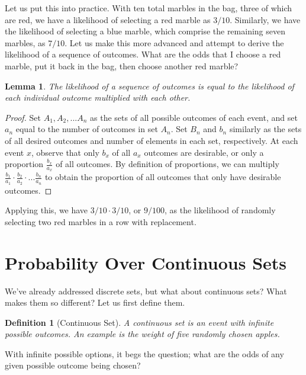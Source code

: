 \documentclass{article}
\newtheorem{definition}{Definition}[section]
\newtheorem{lemma}[theorem]{Lemma}
\begin{document}
Let us put this into practice. With ten total marbles in the bag, three of which are red, we have a likelihood of selecting a red marble as $3/10$. Similarly, we have the likelihood of selecting a blue marble, which comprise the remaining seven marbles, as $7/10$. Let us make this more advanced and attempt to derive the likelihood of a sequence of outcomes. What are the odds that I choose a red marble, put it back in the bag, then choose another red marble?

\begin{lemma}
    The likelihood of a sequence of outcomes is equal to the likelihood of each individual outcome multiplied with each other.
\end{lemma}

\begin{proof}
    Set $A_1, A_2, ...A_n$ as the sets of all possible outcomes of each event, and set $a_n$ equal to the number of outcomes in set $A_n$. Set $B_n$ and $b_n$ similarly as the sets of all desired outcomes and number of elements in each set, respectively. At each event $x$, observe that only $b_x$ of all $a_x$ outcomes are desirable, or only a proportion $\frac{b_x}{a_x}$ of all outcomes. By definition of proportions, we can multiply $\frac{b_1}{a_1} \cdot \frac{b_2}{a_2} \cdot ... \frac{b_n}{a_n}$ to obtain the proportion of all outcomes that only have desirable outcomes.
\end{proof}

Applying this, we have $3/10 \cdot 3/10$, or $9/100$, as the likelihood of randomly selecting two red marbles in a row with replacement.

\section{Probability Over Continuous Sets}

We've already addressed discrete sets, but what about continuous sets? What makes them so different? Let us first define them.

\begin{definition}[Continuous Set]
    A continuous set is an event with infinite possible outcomes. An example is the weight of five randomly chosen apples. 
\end{definition}

With infinite possible options, it begs the question; what are the odds of any given possible outcome being chosen?
\end{document}
